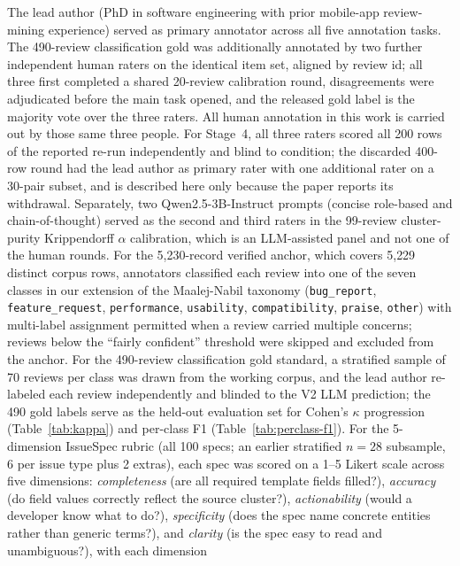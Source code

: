 \documentclass[sigconf, anonymous]{acmart}
\begin{document}
  The lead author (PhD in software engineering with prior mobile-app review-mining experience)
  served as primary annotator across all five annotation tasks. The 490-review classification
  gold was additionally annotated by two further independent human raters on the identical item
  set, aligned by review id; all three first completed a shared 20-review calibration round,
  disagreements were adjudicated before the main task opened, and the released gold label is the
  majority vote over the three raters. All human annotation in this work is carried out by
  those same three people. For Stage~4, all three raters scored all 200 rows of the reported
  re-run independently and blind to condition; the discarded 400-row round had the lead author as
  primary rater with one additional rater on a 30-pair subset, and is described here only because
  the paper reports its withdrawal. Separately, two Qwen2.5-3B-Instruct prompts (concise
  role-based and chain-of-thought) served as the second and third raters in the 99-review
  cluster-purity Krippendorff $\alpha$ calibration, which is an LLM-assisted panel and not one of
  the human rounds. For the 5{,}230-record verified anchor, which covers 5{,}229 distinct corpus rows, annotators classified each review into
  one of the seven classes in our extension of the Maalej-Nabil taxonomy (\texttt{bug\_report}, \texttt{feature\_request},
  \texttt{performance}, \texttt{usability}, \texttt{compatibility}, \texttt{praise},
  \texttt{other}) with multi-label assignment permitted when a review carried multiple concerns;
   reviews below the ``fairly confident'' threshold were skipped and excluded from the anchor.
  For the 490-review classification gold standard, a stratified sample of 70 reviews per class
  was drawn from the working corpus, and the lead author re-labeled each review independently
  and blinded to the V2 LLM prediction; the 490 gold labels serve as the held-out evaluation set
   for Cohen's $\kappa$ progression (Table~\ref{tab:kappa}) and per-class F1
  (Table~\ref{tab:perclass-f1}). For the 5-dimension IssueSpec rubric (all 100 specs; an earlier stratified $n=28$ subsample, 6 per issue
   type plus 2 extras), each spec was scored on a 1--5 Likert scale across five dimensions:
  \emph{completeness} (are all required template fields filled?), \emph{accuracy} (do field
  values correctly reflect the source cluster?), \emph{actionability} (would a developer know
  what to do?), \emph{specificity} (does the spec name concrete entities rather than generic
  terms?), and \emph{clarity} (is the spec easy to read and unambiguous?), with each dimension
\end{document}
